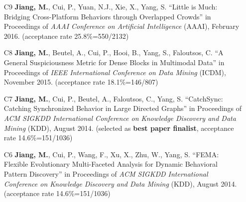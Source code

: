 \documentclass[10pt]{article}
\newenvironment{myindentpar}[1]%
{\begin{list}{}%
         {\setlength{\leftmargin}{#1}}%
         \item[]%
}
{\end{list}}
\newcounter{list}
\begin{document}
\begin{myindentpar}{0.00cm}
\begin{enumerate}[leftmargin=.5cm]
\vspace{-0.1cm}

\item[C9] \textbf{Jiang, M.}, Cui, P., Yuan, N.J., Xie, X., Yang, S. ``Little is Much: Bridging Cross-Platform Behaviors through Overlapped Crowds'' in Proceedings of \emph{AAAI Conference on Artificial Intelligence} (AAAI), February 2016. (acceptance rate 25.8\%=550/2132)

\vspace{-0.1cm}

\item[C8] \textbf{Jiang, M.}, Beutel, A., Cui, P., Hooi, B., Yang, S., Faloutsos, C. ``A General Suspiciousness Metric for Dense Blocks in Multimodal Data'' in Proceedings of \emph{IEEE International Conference on Data Mining} (ICDM), November 2015. (acceptance rate 18.1\%=146/807)

\vspace{-0.1cm}

\item[C7] \textbf{Jiang, M.}, Cui, P., Beutel, A., Faloutsos, C., Yang, S. ``CatchSync: Catching Synchronized Behavior in Large Directed Graphs'' in Proceedings of \emph{ACM SIGKDD International Conference on Knowledge Discovery and Data Mining} (KDD), August 2014. (selected as \textbf{best paper finalist}, acceptance rate 14.6\%=151/1036)

\vspace{-0.1cm}

\item[C6] \textbf{Jiang, M.}, Cui, P., Wang, F., Xu, X., Zhu, W., Yang, S. ``FEMA: Flexible Evolutionary Multi-Faceted Analysis for Dynamic Behavioral Pattern Discovery'' in Proceedings of \emph{ACM SIGKDD International Conference on Knowledge Discovery and Data Mining} (KDD), August 2014. (acceptance rate 14.6\%=151/1036)


\end{enumerate}
\end{myindentpar}
\end{document}
